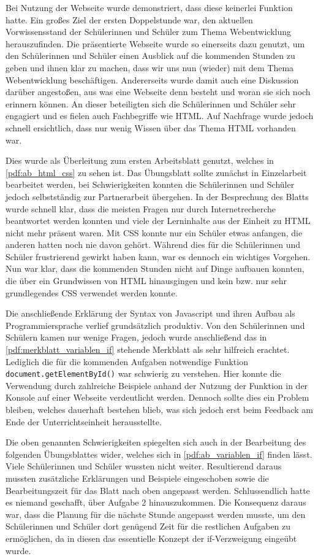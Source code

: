 Bei Nutzung der Webseite wurde demonstriert, dass diese keinerlei Funktion hatte.
Ein großes Ziel der ersten Doppelstunde war, den aktuellen Vorwissensstand der Schülerinnen und Schüler zum Thema Webentwicklung herauszufinden.
Die präsentierte Webseite wurde so einerseits dazu genutzt, um den Schülerinnen und Schüler einen Ausblick auf die kommenden Stunden zu geben und ihnen klar zu machen, dass wir uns nun (wieder) mit dem Thema Webentwicklung beschäftigen.
Andererseits wurde damit auch eine Diskussion darüber angestoßen, aus was eine Webseite denn besteht und woran sie sich noch erinnern können.
An dieser beteiligten sich die Schülerinnen und Schüler sehr engagiert und es fielen auch Fachbegriffe wie HTML.
Auf Nachfrage wurde jedoch schnell ersichtlich, dass nur wenig Wissen über das Thema HTML vorhanden war.

Dies wurde als Überleitung zum ersten Arbeitsblatt genutzt, welches in \autoref{pdf:ab_html_css} zu sehen ist.
Das Übungsblatt sollte zunächst in Einzelarbeit bearbeitet werden, bei Schwierigkeiten konnten die Schülerinnen und Schüler jedoch selbstständig zur Partnerarbeit übergehen.
In der Besprechung des Blatts wurde schnell klar, dass die meisten Fragen nur durch Internetrecherche beantwortet werden konnten und viele der Lerninhalte aus der Einheit zu HTML nicht mehr präsent waren.
Mit CSS konnte nur ein Schüler etwas anfangen, die anderen hatten noch nie davon gehört.
Während dies für die Schülerinnen und Schüler frustrierend gewirkt haben kann, war es dennoch ein wichtiges Vorgehen.
Nun war klar, dass die kommenden Stunden nicht auf Dinge aufbauen konnten, die über ein Grundwissen von HTML hinausgingen und kein bzw. nur sehr grundlegendes CSS verwendet werden konnte.

Die anschließende Erklärung der Syntax von Javascript und ihren Aufbau als Programmiersprache verlief grundsätzlich produktiv.
Von den Schülerinnen und Schülern kamen nur wenige Fragen, jedoch wurde anschließend das in \autoref{pdf:merkblatt_variablen_if} stehende Merkblatt als sehr hilfreich erachtet.
Lediglich die für die kommenden Aufgaben notwendige Funktion \texttt{document.getElementById()} war schwierig zu verstehen.
Hier konnte die Verwendung durch zahlreiche Beispiele anhand der Nutzung der Funktion in der Konsole auf einer Webseite verdeutlicht werden.
Dennoch sollte dies ein Problem bleiben, welches dauerhaft bestehen blieb, was sich jedoch erst beim Feedback am Ende der Unterrichtseinheit herausstellte.

Die oben genannten Schwierigkeiten spiegelten sich auch in der Bearbeitung des folgenden Übungsblattes wider, welches sich in \autoref{pdf:ab_variablen_if} finden lässt.
Viele Schülerinnen und Schüler wussten nicht weiter.
Resultierend daraus mussten zusätzliche Erklärungen und Beispiele eingeschoben sowie die Bearbeitungszeit für das Blatt nach oben angepasst werden.
Schlussendlich hatte es niemand geschafft, über Aufgabe 2 hinauszukommen.
Die Konsequenz daraus war, dass die Planung für die nächste Stunde angepasst werden musste, um den Schülerinnen und Schüler dort genügend Zeit für die restlichen Aufgaben zu ermöglichen, da in diesen das essentielle Konzept der if-Verzweigung eingeübt wurde.

